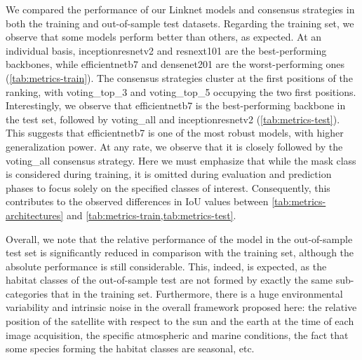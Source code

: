 We compared the performance of our Linknet models and consensus strategies
in both the training and out-of-sample test datasets. Regarding the training
set, we observe that some models perform better than others, as expected. At an
individual basis, inceptionresnetv2 and resnext101 are the best-performing
backbones, while efficientnetb7 and densenet201 are the worst-performing ones
(\cref{tab:metrics-train}). The consensus strategies cluster at the first
positions of the ranking, with voting\_top\_3 and voting\_top\_5 occupying the
two first positions. Interestingly, we observe that efficientnetb7 is the
best-performing backbone in the test set, followed by voting\_all and
inceptionresnetv2 (\cref{tab:metrics-test}). This suggests that efficientnetb7
is one of the most robust models, with higher generalization power. At any
rate, we observe that it is closely followed by the voting\_all consensus
strategy. Here we must emphasize that while the mask class is considered during
training, it is omitted during evaluation and prediction phases to focus solely
on the specified classes of interest. Consequently, this contributes to the
observed differences in IoU values between \cref{tab:metrics-architectures} and
\cref{tab:metrics-train,tab:metrics-test}.

Overall, we note that the relative performance of the model in the
out-of-sample test set is significantly reduced in comparison with the training
set, although the absolute performance is still considerable. This, indeed, is
expected, as the habitat classes of the out-of-sample test are not formed by
exactly the same sub-categories that in the training set. Furthermore, there is
a huge environmental variability and intrinsic noise in the overall framework
proposed here: the relative position of the satellite with respect to the sun
and the earth at the time of each image acquisition, the specific atmospheric
and marine conditions, the fact that some species forming the habitat classes
are seasonal, etc.


